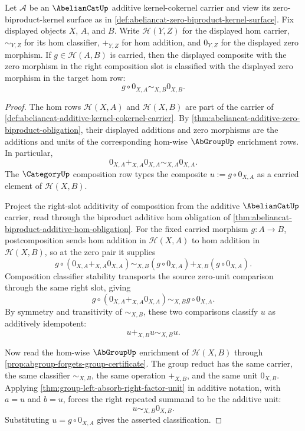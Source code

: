 \begin{theorem}
\label{thm:abeliancat-zero-morphism-right-composition-absorption}
Let $\mathcal A$ be an $\AbelianCatUp$ additive kernel-cokernel carrier and
view its zero-biproduct-kernel surface as in
\autoref{def:abeliancat-zero-biproduct-kernel-surface}. Fix displayed objects
$X$, $A$, and $B$. Write $\mathcal H(Y,Z)$ for the displayed hom carrier,
$\sim_{Y,Z}$ for its hom classifier, $+_{Y,Z}$ for hom addition, and
$0_{Y,Z}$ for the displayed zero morphism. If $g\in\mathcal H(A,B)$ is carried,
then the displayed composite with the zero morphism in the right composition
slot is classified with the displayed zero morphism in the target hom row:
$$
g\circ 0_{X,A}\sim_{X,B}0_{X,B}.
$$
\end{theorem}
\begin{proof}
The hom rows $\mathcal H(X,A)$ and $\mathcal H(X,B)$ are part of the carrier of
\autoref{def:abeliancat-additive-kernel-cokernel-carrier}. By
\autoref{thm:abeliancat-additive-zero-biproduct-obligation}, their displayed
additions and zero morphisms are the additions and units of the corresponding
hom-wise $\AbGroupUp$ enrichment rows. In particular,
$$
0_{X,A}+_{X,A}0_{X,A}\sim_{X,A}0_{X,A}.
$$
The $\CategoryUp$ composition row types the composite
$u:=g\circ 0_{X,A}$ as a carried element of $\mathcal H(X,B)$.

Project the right-slot additivity of composition from the additive
$\AbelianCatUp$ carrier, read through the biproduct additive hom obligation of
\autoref{thm:abeliancat-biproduct-additive-hom-obligation}. For the fixed
carried morphism $g:A\to B$, postcomposition sends hom addition in
$\mathcal H(X,A)$ to hom addition in $\mathcal H(X,B)$, so at the zero pair it
supplies
$$
g\circ(0_{X,A}+_{X,A}0_{X,A})
\sim_{X,B}
(g\circ 0_{X,A})+_{X,B}(g\circ 0_{X,A}).
$$
Composition classifier stability transports the source zero-unit comparison
through the same right slot, giving
$$
g\circ(0_{X,A}+_{X,A}0_{X,A})\sim_{X,B}g\circ 0_{X,A}.
$$
By symmetry and transitivity of $\sim_{X,B}$, these two comparisons classify
$u$ as additively idempotent:
$$
u+_{X,B}u\sim_{X,B}u.
$$

Now read the hom-wise $\AbGroupUp$ enrichment of $\mathcal H(X,B)$ through
\autoref{prop:abgroup-forgets-group-certificate}. The group reduct has the
same carrier, the same classifier $\sim_{X,B}$, the same operation
$+_{X,B}$, and the same unit $0_{X,B}$. Applying
\autoref{thm:group-left-absorb-right-factor-unit} in additive notation, with
$a=u$ and $b=u$, forces the right repeated summand to be the additive unit:
$$
u\sim_{X,B}0_{X,B}.
$$
Substituting $u=g\circ 0_{X,A}$ gives the asserted classification.
\end{proof}


